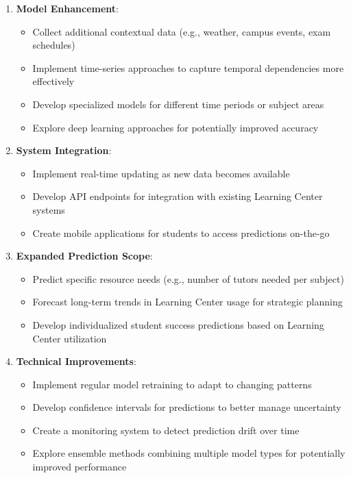 \documentclass[12pt,letterpaper]{article}
\begin{document}
\begin{enumerate}
    \item \textbf{Model Enhancement}:
    \begin{itemize}
        \item Collect additional contextual data (e.g., weather, campus events, exam schedules)
        \item Implement time-series approaches to capture temporal dependencies more effectively
        \item Develop specialized models for different time periods or subject areas
        \item Explore deep learning approaches for potentially improved accuracy
    \end{itemize}

    \item \textbf{System Integration}:
    \begin{itemize}
        \item Implement real-time updating as new data becomes available
        \item Develop API endpoints for integration with existing Learning Center systems
        \item Create mobile applications for students to access predictions on-the-go
    \end{itemize}

    \item \textbf{Expanded Prediction Scope}:
    \begin{itemize}
        \item Predict specific resource needs (e.g., number of tutors needed per subject)
        \item Forecast long-term trends in Learning Center usage for strategic planning
        \item Develop individualized student success predictions based on Learning Center utilization
    \end{itemize}

    \item \textbf{Technical Improvements}:
    \begin{itemize}
        \item Implement regular model retraining to adapt to changing patterns
        \item Develop confidence intervals for predictions to better manage uncertainty
        \item Create a monitoring system to detect prediction drift over time
        \item Explore ensemble methods combining multiple model types for potentially improved performance
    \end{itemize}
\end{enumerate}
\end{document}
